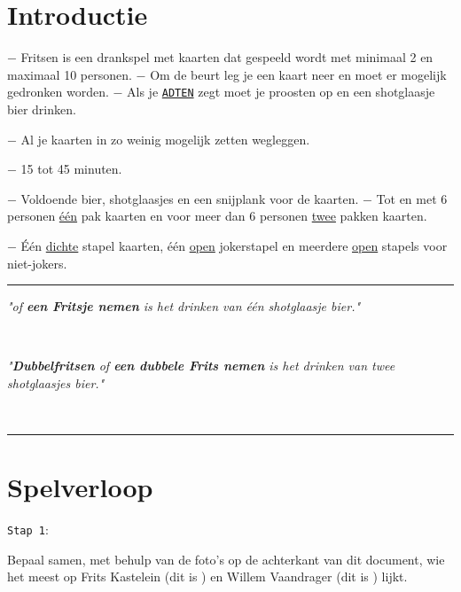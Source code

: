 \vspace{-0.5cm}
\section*{Introductie}
$-$ Fritsen is een drankspel met kaarten dat gespeeld wordt met minimaal 2 en maximaal 10 personen. \newline $-$ Om de beurt leg je een kaart neer en moet er mogelijk gedronken worden. \newline $-$ Als je \ul{\texttt{ADTEN}} zegt moet je proosten op  en een shotglaasje bier drinken. 
\vspace*{-0.22cm} 

$-$ Al je kaarten in zo weinig mogelijk zetten wegleggen.

\vspace*{-0.22cm} 

$-$ 15 tot 45 minuten.

\vspace*{-0.22cm} 

$-$ Voldoende bier, shotglaasjes en een snijplank voor de kaarten. \newline $-$ Tot en met 6 personen \ul{\'e\'en} pak kaarten en voor meer dan 6 personen \ul{twee} pakken kaarten.

\vspace*{-0.22cm} 

$-$ \'E\'en \ul{dichte} stapel kaarten, \'e\'en \ul{open} jokerstapel en meerdere \ul{open} stapels voor niet-jokers.

\noindent\rule{\textwidth}{1pt}
\centerline{\textit{"\Fritsen of \textbf{een Fritsje nemen} is het drinken van één shotglaasje bier."}} \\
\centerline{\textit{"\textbf{Dubbelfritsen} of \textbf{een dubbele Frits nemen} is het drinken van twee shotglaasjes bier."}} \vspace*{-0.7cm}  \\
\noindent\rule{\textwidth}{1pt}

\vspace*{-0.45cm}

\section*{Spelverloop}
\label{sec:introductie}
\begin{minipage}[t]{.09\textwidth}
\texttt{Stap 1}:
\end{minipage}
\hfill
\begin{minipage}[t]{.91\textwidth}
Bepaal samen, met behulp van de foto's op de achterkant van dit document, wie het meest op Frits Kastelein (dit is \FritsN) en Willem Vaandrager (dit is \WillemN
) lijkt. \\
\end{minipage}

